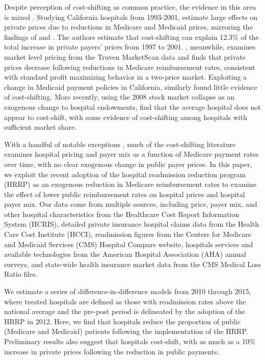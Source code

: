 \documentclass[12pt]{article}
\begin{document}
Despite perception of cost-shifting as common practice, the evidence in this area is mixed \citep{morrisey1994,frakt2011}. Studying California hospitals from 1993-2001, \cite{zwanziger2006} estimate large effects on private prices due to reductions in Medicare and Medicaid prices, mirroring the findings of \cite{lee2003} and \cite{zwanziger2000}. The authors estimate that cost-shifting can explain 12.3\% of the total increase in private payers' prices from 1997 to 2001. \cite{white2013}, meanwhile, examines market level pricing from the Truven MarketScan data and finds that private prices decrease following reductions in Medicare reimbursement rates, consistent with standard profit maximizing behavior in a two-price market. Exploiting a change in Medicaid payment policies in California, \cite{dranove1998} similarly found little evidence of cost-shifting. More recently, using the 2008 stock market collapse as an exogenous change to hospital endowments, \cite{dranove2017} find that the average hospital does not appear to cost-shift, with some evidence of cost-shifting among hospitals with sufficient market share.

With a handful of notable exceptions \citep{dranove1988,dranove1998,wu2010,dranove2017}, much of the cost-shifting literature examines hospital pricing and payer mix as a function of Medicare payment rates over time, with no clear exogenous change in public payer prices. In this paper, we exploit the recent adoption of the hospital readmission reduction program (HRRP) as an exogenous reduction in Medicare reimbursement rates to examine the effect of lower public reimbursement rates on hospital prices and hospital payer mix. Our data come from multiple sources, including price, payer mix, and other hospital characteristics from the Healthcare Cost Report Information System (HCRIS), detailed private insurance hospital claims data from the Health Care Cost Institute (HCCI), readmission figures from the Centers for Medicare and Medicaid Services (CMS) Hospital Compare website, hospitals services and available technologies from the American Hospital Association (AHA) annual surveys, and state-wide health insurance market data from the CMS Medical Loss Ratio files.

We estimate a series of difference-in-difference models from 2010 through 2015, where treated hospitals are defined as those with readmission rates above the national average and the pre-post period is delineated by the adoption of the HRRP in 2012. Here, we find that hospitals reduce the proportion of public (Medicare and Medicaid) patients following the implementation of the HRRP. Preliminary results also suggest that hospitals cost-shift, with as much as a 10\% increase in private prices following the reduction in public payments. 
\end{document}

